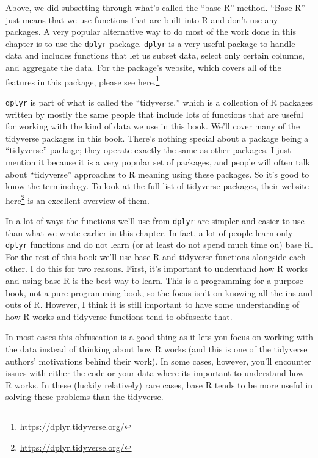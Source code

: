 \documentclass[
]{krantz}
\renewcommand{\href}[2]{#2\footnote{\url{#1}}}
\begin{document}
Above, we did subsetting through what's called the ``base
R'' method. ``Base R'' just means that we use functions that
are built into R and don't use any packages. A very popular
alternative way to do most of the work done in this chapter
is to use the \texttt{dplyr} package. \texttt{dplyr} is a
very useful package to handle data and includes functions
that let us subset data, select only certain columns, and
aggregate the data. For the package's website, which covers
all of the features in this package, please see
\href{https://dplyr.tidyverse.org/}{here.}

\texttt{dplyr} is part of what is called the ``tidyverse,''
which is a collection of R packages written by mostly the
same people that include lots of functions that are useful
for working with the kind of data we use in this book. We'll
cover many of the tidyverse packages in this book. There's
nothing special about a package being a ``tidyverse''
package; they operate exactly the same as other packages. I
just mention it because it is a very popular set of
packages, and people will often talk about ``tidyverse''
approaches to R meaning using these packages. So it's good
to know the terminology. To look at the full list of
tidyverse packages, their website
\href{https://dplyr.tidyverse.org/}{here} is an excellent
overview of them.

In a lot of ways the functions we'll use from \texttt{dplyr}
are simpler and easier to use than what we wrote earlier in
this chapter. In fact, a lot of people learn only
\texttt{dplyr} functions and do not learn (or at least do
not spend much time on) base R. For the rest of this book
we'll use base R and tidyverse functions alongside each
other. I do this for two reasons. First, it's important to
understand how R works and using base R is the best way to
learn. This is a programming-for-a-purpose book, not a pure
programming book, so the focus isn't on knowing all the ins
and outs of R. However, I think it is still important to
have some understanding of how R works and tidyverse
functions tend to obfuscate that.

In most cases this obfuscation is a good thing as it lets
you focus on working with the data instead of thinking about
how R works (and this is one of the tidyverse authors'
motivations behind their work). In some cases, however,
you'll encounter issues with either the code or your data
where its important to understand how R works. In these
(luckily relatively) rare cases, base R tends to be more
useful in solving these problems than the tidyverse.
\end{document}
